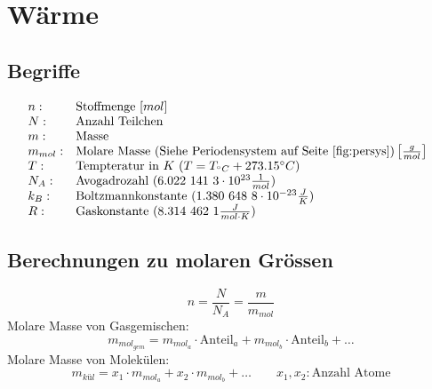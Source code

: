 



\chapter{Wärme}

\section{Begriffe}
\[ \begin{array}{@{}ll} 
n:      & \text{Stoffmenge $[mol]$} \\
N:      & \text{Anzahl Teilchen} \\
m:      & \text{Masse} \\
m_{mol}:& \text{Molare Masse 
          (Siehe Periodensystem auf Seite \pageref{fig:persys})} 
          \left\lbrack\frac{g}{mol}\right\rbrack \\
T:      & \text{Tempteratur in $K$ } 
            (T = T_{^\circ C} + 273.15 ^\circ C) \\
N_A:    & \text{Avogadrozahl }
            (6.022~141~3 \cdot 10^{23} \frac{1}{mol}) \\
k_B:    & \text{Boltzmannkonstante } 
            (1.380~648~8 \cdot 10^{-23} \frac{J}{K} ) \\
R:      & \text{Gaskonstante } 
            (8.314~462~1 \frac{J}{mol \cdot K}) \\
\end{array} \]

\section{Berechnungen zu molaren Grössen}
\[ \boxed{n = \frac{N}{N_A} = \frac{m}{m_{mol}}} \]
Molare Masse von Gasgemischen: 
\[ \boxed{m_{mol_{gem}} = m_{mol_{a}} \cdot \text{Anteil}_a 
+ m_{mol_{b}} \cdot \text{Anteil}_b + \dots} \]
Molare Masse von Molekülen: 
\[ \boxed{m_{kül} = x_1 \cdot m_{mol_a} + x_2 \cdot m_{mol_b} + \dots } 
\qquad x_1, x_2: \text{Anzahl Atome} \]

